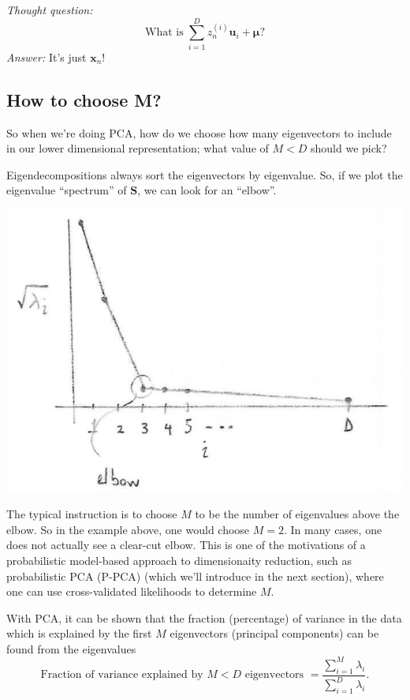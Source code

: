 \documentclass[11pt]{article}
\newcommand{\xb}{\mathbf{x}}
\newcommand{\ub}{\symbf{\mu}}
\begin{document}
\textit{Thought question:}
\begin{equation*}
  \text{What is} \; \sum_{i=1}^D z_n^{(i)} \mathbf{u}_i + \ub?
\end{equation*}
\textit{Answer:} It's just $\xb_n$!

\subsection{How to choose M?}
So when we're doing PCA, how do we choose how many eigenvectors to include
in our lower dimensional representation; what value of $M < D$ should we pick?

Eigendecompositions always sort the eigenvectors by eigenvalue. So, if we plot
the eigenvalue ``spectrum'' of $\mathbf{S}$, we can look for an ``elbow''.
\begin{center}
  \includegraphics[scale=0.5]{Eigenspectrum.png}
\end{center}
The typical instruction is to choose $M$ to be the number of eigenvalues above
the elbow. So in the example above, one would choose $M=2$. In many cases, one
does not actually see a clear-cut elbow. This is one of the motivations of a
probabilistic model-based approach to dimensionaity reduction, such as
probabilistic PCA (P-PCA) (which we'll introduce in the next section), where
one can use cross-validated likelihoods to determine $M$.

With PCA, it can be shown that the fraction (percentage) of variance in the
data which is explained by the first $M$ eigenvectors (principal components)
can be found from the eigenvalues
\begin{equation*}
  \text{Fraction of variance explained by $M < D$ eigenvectors } =
  \frac{\sum_{i=1}^M \lambda_i}{\sum_{i=1}^D \lambda_i}.
\end{equation*}
\end{document}
